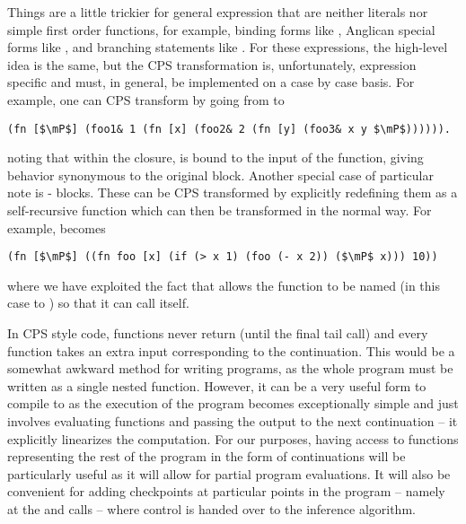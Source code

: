 Things are a little
trickier for general expression that are neither literals nor simple first order functions, for example,
binding forms like , Anglican special forms like \sample, and branching statements like .
For these expressions, the high-level idea is the same, but the CPS transformation is, unfortunately, 
expression specific and must, in general, be implemented on a case by case basis.  
For example, one can CPS transform  by going from
 to
 \begin{lstlisting}[basicstyle=\ttfamily\small,frame=none]
 (fn [$\mP$] (foo1& 1 (fn [x] (foo2& 2 (fn [y] (foo3& x y $\mP$)))))).
 \end{lstlisting}\vspace{-8pt}
noting that within the  closure,  is bound to the input of the 
function, giving behavior synonymous to the original
 block.  
Another special case of particular note is - blocks.  These can be CPS
transformed by explicitly redefining them as a self-recursive function which can then
be transformed in the normal way.  For example,
becomes
\begin{lstlisting}[basicstyle=\ttfamily\small,frame=none]
 (fn [$\mP$] ((fn foo [x] (if (> x 1) (foo (- x 2)) ($\mP$ x))) 10))
 \end{lstlisting}\vspace{-8pt}
where we have exploited the fact that  allows the function to be named (in this case to
) so that it can call itself.
 
In CPS style code, functions never return (until the final tail call) and every function takes an
extra input corresponding to the continuation.  This would be a somewhat awkward method for
writing programs, as the whole program must be written as a single nested function.  However,
it can be a very useful form to compile to as the execution of the program becomes
exceptionally simple and just involves evaluating functions and passing the output to the
next continuation -- it explicitly linearizes the computation.  For our purposes, having access
to functions representing the rest of the program in the form of continuations will be
particularly useful as it will allow for partial program evaluations.  It will also be convenient
for adding checkpoints at particular points in the program -- namely at the \sample and
\observe calls -- where control is handed over to the inference algorithm.

